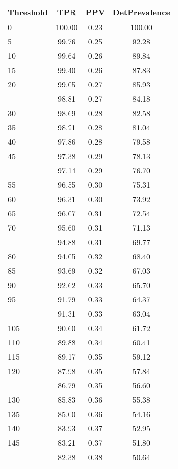 \begin{table}[ht]
\centering
\begin{tabular}{lccc}
  \toprule
Threshold & TPR & PPV & DetPrevalence \\ 
  \midrule
0 & 100.00 & 0.23 & 100.00 \\ 
  5 & 99.76 & 0.25 & 92.28 \\ 
  10 & 99.64 & 0.26 & 89.84 \\ 
  15 & 99.40 & 0.26 & 87.83 \\ 
  20 & 99.05 & 0.27 & 85.93 \\ 
   \addlinespace
25 & 98.81 & 0.27 & 84.18 \\ 
  30 & 98.69 & 0.28 & 82.58 \\ 
  35 & 98.21 & 0.28 & 81.04 \\ 
  40 & 97.86 & 0.28 & 79.58 \\ 
  45 & 97.38 & 0.29 & 78.13 \\ 
   \addlinespace
50 & 97.14 & 0.29 & 76.70 \\ 
  55 & 96.55 & 0.30 & 75.31 \\ 
  60 & 96.31 & 0.30 & 73.92 \\ 
  65 & 96.07 & 0.31 & 72.54 \\ 
  70 & 95.60 & 0.31 & 71.13 \\ 
   \addlinespace
75 & 94.88 & 0.31 & 69.77 \\ 
  80 & 94.05 & 0.32 & 68.40 \\ 
  85 & 93.69 & 0.32 & 67.03 \\ 
  90 & 92.62 & 0.33 & 65.70 \\ 
  95 & 91.79 & 0.33 & 64.37 \\ 
   \addlinespace
100 & 91.31 & 0.33 & 63.04 \\ 
  105 & 90.60 & 0.34 & 61.72 \\ 
  110 & 89.88 & 0.34 & 60.41 \\ 
  115 & 89.17 & 0.35 & 59.12 \\ 
  120 & 87.98 & 0.35 & 57.84 \\ 
   \addlinespace
125 & 86.79 & 0.35 & 56.60 \\ 
  130 & 85.83 & 0.36 & 55.38 \\ 
  135 & 85.00 & 0.36 & 54.16 \\ 
  140 & 83.93 & 0.37 & 52.95 \\ 
  145 & 83.21 & 0.37 & 51.80 \\ 
   \addlinespace
150 & 82.38 & 0.38 & 50.64 \\ 

\end{tabular}
\end{table}
